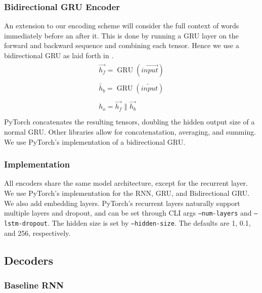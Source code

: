 \documentclass[twoside,twocolumn]{article}
\begin{document}
\subsubsection{Bidirectional GRU Encoder}
An extension to our encoding scheme will consider the full context of words
immediately before an after it. This is done by running a GRU layer on the
forward and backward sequence and combining each tensor. Hence we use a
bidirectional GRU as laid forth in \cite{bahdanau2014neural}.
\begin{equation}
  \label{eq:bidirectional}
  \begin{split}
    \begin{array}{ll}
      \overrightarrow{h_f} = \operatorname{GRU}(\overrightarrow{input})\\
      \\
      \overleftarrow{h_b} = \operatorname{GRU}(\overleftarrow{input})\\
      \\
      h_o = \overrightarrow{h_f} \,\,\Vert \,\, \overrightarrow{h_b}\\
    \end{array}
  \end{split}
\end{equation}
PyTorch concatenates the resulting tensors, doubling the hidden output size
of a normal GRU. Other libraries allow for concatenatation, averaging,
and summing. We use PyTorch's implementation of a bidirectional GRU.

\subsubsection{Implementation}
All encoders share the same model architecture, except for the recurrent layer.
We use PyTorch's implementation for the RNN, GRU, and Bidirectional GRU.
We also add embedding layers. PyTorch's recurrent layers naturally support
multiple layers and dropout, and can be set through CLI args
\texttt{--num-layers} and \texttt{--lstm-dropout}. The hidden size is set by
\texttt{--hidden-size}. The defaults are 1, 0.1, and 256, respectively.


\subsection{Decoders}
\subsubsection{Baseline RNN}
\end{document}
